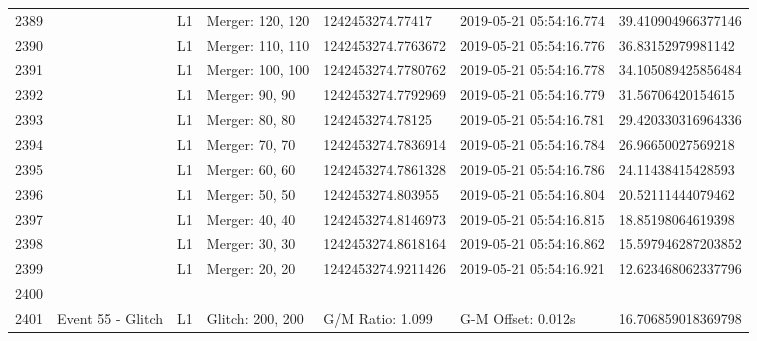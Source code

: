 \begin{longtable}{lllllll}
2389 &                                                    &       L1 &  Merger: 120, 120 &    1242453274.77417 &  2019-05-21 05:54:16.774 &  39.410904966377146 \\
2390 &                                                    &       L1 &  Merger: 110, 110 &  1242453274.7763672 &  2019-05-21 05:54:16.776 &   36.83152979981142 \\
2391 &                                                    &       L1 &  Merger: 100, 100 &  1242453274.7780762 &  2019-05-21 05:54:16.778 &  34.105089425856484 \\
2392 &                                                    &       L1 &    Merger: 90, 90 &  1242453274.7792969 &  2019-05-21 05:54:16.779 &   31.56706420154615 \\
2393 &                                                    &       L1 &    Merger: 80, 80 &    1242453274.78125 &  2019-05-21 05:54:16.781 &  29.420330316964336 \\
2394 &                                                    &       L1 &    Merger: 70, 70 &  1242453274.7836914 &  2019-05-21 05:54:16.784 &   26.96650027569218 \\
2395 &                                                    &       L1 &    Merger: 60, 60 &  1242453274.7861328 &  2019-05-21 05:54:16.786 &   24.11438415428593 \\
2396 &                                                    &       L1 &    Merger: 50, 50 &   1242453274.803955 &  2019-05-21 05:54:16.804 &   20.52111444079462 \\
2397 &                                                    &       L1 &    Merger: 40, 40 &  1242453274.8146973 &  2019-05-21 05:54:16.815 &   18.85198064619398 \\
2398 &                                                    &       L1 &    Merger: 30, 30 &  1242453274.8618164 &  2019-05-21 05:54:16.862 &  15.597946287203852 \\
2399 &                                                    &       L1 &    Merger: 20, 20 &  1242453274.9211426 &  2019-05-21 05:54:16.921 &  12.623468062337796 \\
2400 &                                                    &          &                   &                     &                          &                     \\
2401 &                                  Event 55 - Glitch &       L1 &  Glitch: 200, 200 &    G/M Ratio: 1.099 &       G-M Offset: 0.012s &  16.706859018369798 \\

\end{longtable}

